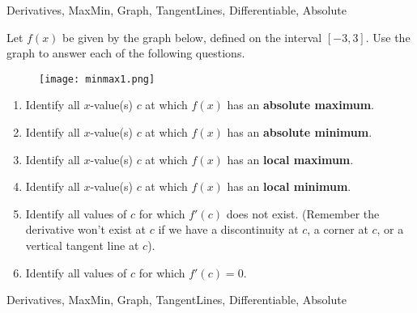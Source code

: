 

	
\begin{tagblock}{Derivatives, MaxMin, Graph, TangentLines, Differentiable, Absolute}
\begin{question}
	

Let $f(x)$ be given by the graph below, defined on the interval $[-3,3]$.  Use the graph to answer each of the following questions.
\begin{figure}[h]
\centering
\texttt{[image: minmax1.png]} 
\end{figure}

\begin{enumerate}
\item Identify all $x$-value(s) $c$ at which $f(x)$ has an \textbf{absolute maximum}.

\vspace{.25in}
\item Identify all  $x$-value(s) $c$ at which $f(x)$ has an \textbf{absolute minimum}.
\vspace{.25in}

\item Identify all $x$-value(s) $c$ at which $f(x)$ has an \textbf{local maximum}.
\vspace{.25in}

\item Identify all  $x$-value(s) $c$ at which $f(x)$ has an \textbf{local minimum}.
\vspace{.25in}

\item Identify all values of $c$ for which $f'(c)$ does not exist.  (Remember the derivative won't exist at $c$ if we have a discontinuity at $c$, a corner at $c$, or a vertical tangent line at $c$).

\vspace{.25in}

\item Identify all values of $c$ for which $f'(c) = 0$.

\vspace{.25in}




\end{enumerate}


	
\begin{tags}
	   Derivatives, MaxMin, Graph, TangentLines, Differentiable, Absolute
\end{tags}
	
\begin{diary}
\end{diary}
	
\begin{solution}
	   
\end{solution}
	
\end{question}

\end{tagblock}

